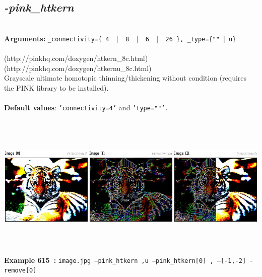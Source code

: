 \documentclass[a4paper,11pt,twoside]{book}
\begin{document}
\subsection{\emph{-pink\_htkern} }\vspace*{-0.5em}
~\\\textbf{Arguments: } 
{\small \texttt{\_connectivity=\{ 4 ~$|$~ 8 ~$|$~ 6 ~$|$~ 26 \}, \_type=\{""~$|$~u\}}}\\~\\
(http://pinkhq.com/doxygen/htkern\_8c.html)
~\\(http://pinkhq.com/doxygen/htkernu\_8c.html)
~\\Grayscale ultimate homotopic thinning/thickening without condition (requires the PINK library to be installed).
~\\~\\\textbf{Default values}: {\small \texttt{'connectivity=4'} and \texttt{'type=""'.}}
\begin{center}\includegraphics[keepaspectratio=true,height=7cm,width=\textwidth]{img/gmic_def615.jpg}\\
{\footnotesize \textbf{Example 615~:} \texttt{image.jpg --pink\_htkern ,u --pink\_htkern[0] , ---[-1,-2] -remove[0]}}
\end{center}
\end{document}
